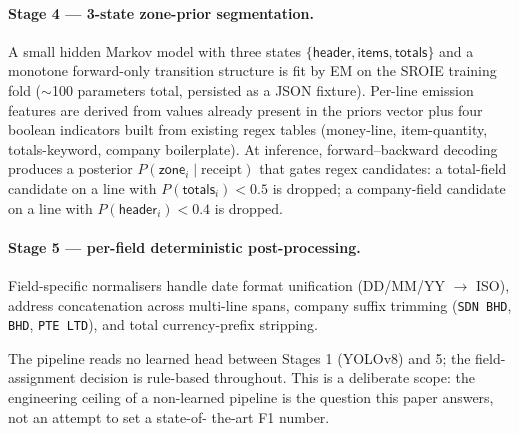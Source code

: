 \paragraph{Stage 4 --- 3-state zone-prior segmentation.}  A small
hidden Markov model with three states
$\{\textsf{header}, \textsf{items}, \textsf{totals}\}$ and a
monotone forward-only transition structure is fit by EM on the SROIE
training fold ($\sim$100 parameters total, persisted as a JSON fixture).
Per-line emission features are derived from values already present in
the priors vector plus four boolean indicators built from existing
regex tables (money-line, item-quantity, totals-keyword, company
boilerplate).  At inference, forward--backward decoding produces a
posterior $P(\textsf{zone}_i \mid \text{receipt})$ that gates regex
candidates: a \textsf{total}-field candidate on a line with
$P(\textsf{totals}_i) < 0.5$ is dropped; a \textsf{company}-field
candidate on a line with $P(\textsf{header}_i) < 0.4$ is dropped.

\paragraph{Stage 5 --- per-field deterministic post-processing.}
Field-specific normalisers handle date format unification (DD/MM/YY
$\to$ ISO), address concatenation across multi-line spans, company
suffix trimming (\texttt{SDN BHD}, \texttt{BHD}, \texttt{PTE LTD}),
and total currency-prefix stripping.

The pipeline reads no learned head between Stages 1 (YOLOv8) and 5;
the field-assignment decision is rule-based throughout.  This is a
deliberate scope: the engineering ceiling of a non-learned pipeline
is the question this paper answers, not an attempt to set a state-of-
the-art F1 number.
